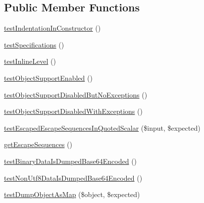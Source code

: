 \subsection*{Public Member Functions}
\begin{DoxyCompactItemize}
\item 
\mbox{\hyperlink{class_symfony_1_1_component_1_1_yaml_1_1_tests_1_1_dumper_test_aed5e2b12145ecc4e79fa95f9543164f8}{test\+Indentation\+In\+Constructor}} ()
\item 
\mbox{\hyperlink{class_symfony_1_1_component_1_1_yaml_1_1_tests_1_1_dumper_test_a40ba0d9bb69b061c9077ddff7ceab79a}{test\+Specifications}} ()
\item 
\mbox{\hyperlink{class_symfony_1_1_component_1_1_yaml_1_1_tests_1_1_dumper_test_a311cfeee056148bac83c45e7a572bfc4}{test\+Inline\+Level}} ()
\item 
\mbox{\hyperlink{class_symfony_1_1_component_1_1_yaml_1_1_tests_1_1_dumper_test_a57928b695e7198894d7d584c32715a9e}{test\+Object\+Support\+Enabled}} ()
\item 
\mbox{\hyperlink{class_symfony_1_1_component_1_1_yaml_1_1_tests_1_1_dumper_test_af91b4bceeb3a35225c1b4c44c7638375}{test\+Object\+Support\+Disabled\+But\+No\+Exceptions}} ()
\item 
\mbox{\hyperlink{class_symfony_1_1_component_1_1_yaml_1_1_tests_1_1_dumper_test_aaf0de7d76950be31f7fb32b9b15333b2}{test\+Object\+Support\+Disabled\+With\+Exceptions}} ()
\item 
\mbox{\hyperlink{class_symfony_1_1_component_1_1_yaml_1_1_tests_1_1_dumper_test_a641c14721403d6dfa39fd8d27abd2b4d}{test\+Escaped\+Escape\+Sequences\+In\+Quoted\+Scalar}} (\$input, \$expected)
\item 
\mbox{\hyperlink{class_symfony_1_1_component_1_1_yaml_1_1_tests_1_1_dumper_test_a85925167fbf83c4bb9fefb0ba5705ab4}{get\+Escape\+Sequences}} ()
\item 
\mbox{\hyperlink{class_symfony_1_1_component_1_1_yaml_1_1_tests_1_1_dumper_test_a7df8ba6df1c00aea5e6f4bd6063d6a55}{test\+Binary\+Data\+Is\+Dumped\+Base64\+Encoded}} ()
\item 
\mbox{\hyperlink{class_symfony_1_1_component_1_1_yaml_1_1_tests_1_1_dumper_test_ae15041b56e2e141413e763c944da09aa}{test\+Non\+Utf8\+Data\+Is\+Dumped\+Base64\+Encoded}} ()
\item 
\mbox{\hyperlink{class_symfony_1_1_component_1_1_yaml_1_1_tests_1_1_dumper_test_a1d9459915ad3544aaba9a077f689dd3c}{test\+Dump\+Object\+As\+Map}} (\$object, \$expected)
\item 

\end{DoxyCompactItemize}
